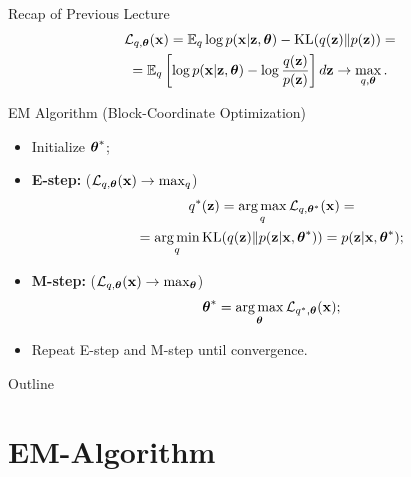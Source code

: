 \documentclass{beamer}
\begin{document}
\begin{frame}{Recap of Previous Lecture}
	\vspace{-0.5cm}
	\begin{multline*}
		\mathcal{L}_{q, \boldsymbol{\theta}}(\mathbf{x})  =  \mathbb{E}_{q} \log p(\mathbf{x} | \mathbf{z}, \boldsymbol{\theta}) - \mathrm{KL} (q(\mathbf{z}) \| p(\mathbf{z})) = \\ = \mathbb{E}_q \left[ \log p(\mathbf{x} | \mathbf{z}, \boldsymbol{\theta}) - \log \frac{q(\mathbf{z})}{p(\mathbf{z})} \right]d\mathbf{z} \rightarrow \max_{q, \boldsymbol{\theta}}.
	\end{multline*}
	\vspace{-0.5cm}
	\begin{block}{EM Algorithm (Block-Coordinate Optimization)}
		\begin{itemize}
			\item Initialize $\boldsymbol{\theta}^*$;
			\item \textbf{E-step:} ($\mathcal{L}_{q, \boldsymbol{\theta}}(\mathbf{x}) \rightarrow \max_q$)
			\vspace{-0.2cm}
			\begin{multline*}
				q^*(\mathbf{z}) = \operatorname*{arg\,max}_q \mathcal{L}_{q, \boldsymbol{\theta}^*}(\mathbf{x}) = \\
				= \operatorname*{arg\,min}_q \mathrm{KL}(q(\mathbf{z}) \| p(\mathbf{z} | \mathbf{x}, \boldsymbol{\theta}^*)) = p(\mathbf{z}| \mathbf{x}, \boldsymbol{\theta}^*);
			\end{multline*}
			\item \textbf{M-step:} ($\mathcal{L}_{q, \boldsymbol{\theta}}(\mathbf{x}) \rightarrow \max_{\boldsymbol{\theta}}$)
			\vspace{-0.2cm}
			\[
				\boldsymbol{\theta}^* = \operatorname*{arg\,max}_{\boldsymbol{\theta}} \mathcal{L}_{q^*, \boldsymbol{\theta}}(\mathbf{x});
			\]
			\vspace{-0.2cm}
			\item Repeat E-step and M-step until convergence.
		\end{itemize}
	\end{block}
\end{frame}
\begin{frame}{Outline}
	\tableofcontents
\end{frame}
\section{EM-Algorithm}
\end{document}

